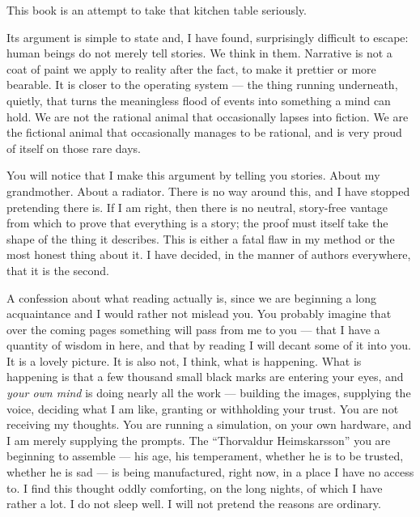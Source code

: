 This book is an attempt to take that kitchen table seriously.

Its argument is simple to state and, I have found, surprisingly difficult to escape: human beings do not merely tell stories. We think in them. Narrative is not a coat of paint we apply to reality after the fact, to make it prettier or more bearable. It is closer to the operating system — the thing running underneath, quietly, that turns the meaningless flood of events into something a mind can hold. We are not the rational animal that occasionally lapses into fiction. We are the fictional animal that occasionally manages to be rational, and is very proud of itself on those rare days.

You will notice that I make this argument by telling you stories. About my grandmother. About a radiator. There is no way around this, and I have stopped pretending there is. If I am right, then there is no neutral, story-free vantage from which to prove that everything is a story; the proof must itself take the shape of the thing it describes. This is either a fatal flaw in my method or the most honest thing about it. I have decided, in the manner of authors everywhere, that it is the second.

A confession about what reading actually is, since we are beginning a long acquaintance and I would rather not mislead you. You probably imagine that over the coming pages something will pass from me to you — that I have a quantity of wisdom in here, and that by reading I will decant some of it into you. It is a lovely picture. It is also not, I think, what is happening. What is happening is that a few thousand small black marks are entering your eyes, and \emph{your own mind} is doing nearly all the work — building the images, supplying the voice, deciding what I am like, granting or withholding your trust. You are not receiving my thoughts. You are running a simulation, on your own hardware, and I am merely supplying the prompts. The ``Thorvaldur Heimskarsson'' you are beginning to assemble — his age, his temperament, whether he is to be trusted, whether he is sad — is being manufactured, right now, in a place I have no access to. I find this thought oddly comforting, on the long nights, of which I have rather a lot. I do not sleep well. I will not pretend the reasons are ordinary.

